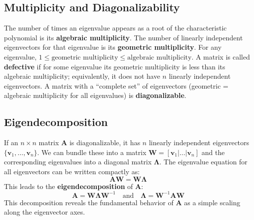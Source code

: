 \subsection{Multiplicity and Diagonalizability}

The number of times an eigenvalue appears as a root of the characteristic polynomial is its \textbf{algebraic multiplicity}. The number of linearly independent eigenvectors for that eigenvalue is its \textbf{geometric multiplicity}. For any eigenvalue, $1 \le \text{geometric multiplicity} \le \text{algebraic multiplicity}$. A matrix is called \textbf{defective} if for some eigenvalue its geometric multiplicity is less than its algebraic multiplicity; equivalently, it does not have \(n\) linearly independent eigenvectors. A matrix with a ``complete set'' of eigenvectors (geometric = algebraic multiplicity for all eigenvalues) is \textbf{diagonalizable}.

\subsection{Eigendecomposition}
If an $n \times n$ matrix $\mathbf{A}$ is diagonalizable, it has $n$ linearly independent eigenvectors $\{\mathbf{v}_1, \dots, \mathbf{v}_n\}$. We can bundle these into a matrix $\mathbf{W} = [\mathbf{v}_1 | \dots | \mathbf{v}_n]$ and the corresponding eigenvalues into a diagonal matrix $\mathbf{\Lambda}$. The eigenvalue equation for all eigenvectors can be written compactly as:
$$ \mathbf{A}\mathbf{W} = \mathbf{W}\mathbf{\Lambda} $$
This leads to the \textbf{eigendecomposition} of $\mathbf{A}$:
$$ \mathbf{A} = \mathbf{W} \mathbf{\Lambda} \mathbf{W}^{-1} \quad \text{and} \quad \mathbf{\Lambda} = \mathbf{W}^{-1} \mathbf{A} \mathbf{W} $$
This decomposition reveals the fundamental behavior of $\mathbf{A}$ as a simple scaling along the eigenvector axes.

